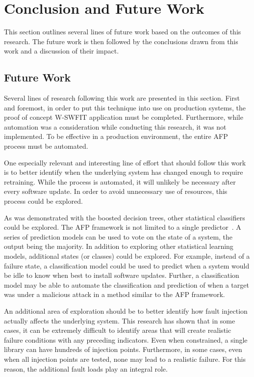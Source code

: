 \section{Conclusion and Future Work} \label{chapter5}
This section outlines several lines of future work based on the outcomes of
this research.  The future work is then followed by the conclusions drawn from
this work and a discussion of their impact.

\subsection{Future Work}
Several lines of research following this work are presented in this section.
First and foremost, in order to put this technique into use on production
systems, the proof of concept \ac{W-SWFIT} application must be completed.
Furthermore, while automation was a consideration while conducting this
research, it was not implemented.  To be effective in a production environment,
the entire \ac{AFP} process must be automated.

One especially relevant and interesting line of effort that should follow this
work is to better identify when the underlying system has changed enough to
require retraining.  While the process is automated, it will unlikely be
necessary after every software update.  In order to avoid unnecessary use of
resources, this process could be explored.

As was demonstrated with the boosted decision trees, other statistical
classifiers could be explored.  The \ac{AFP} framework is not limited to a
single predictor~\cite{irrera2015}.  A series of prediction models can be used
to vote on the state of a system, the output being the majority.  In addition
to exploring other statistical learning models, additional states (or classes)
could be explored.  For example, instead of a failure state, a classification
model could be used to predict when a system would be idle to know when best to
install software updates.  Further, a classification model may be able to
automate the classification and prediction of when a target was under a
malicious attack in a method similar to the \ac{AFP} framework.

An additional area of exploration should be to better identify how fault
injection actually affects the underlying system.  This research has shown that
in some cases, it can be extremely difficult to identify areas that will create
realistic failure conditions with any preceding indicators.  Even when
constrained, a single library can have hundreds of injection points.
Furthermore, in some cases, even when all injection points are tested, none may
lead to a realistic failure.  For this reason, the additional fault loads play
an integral role.

